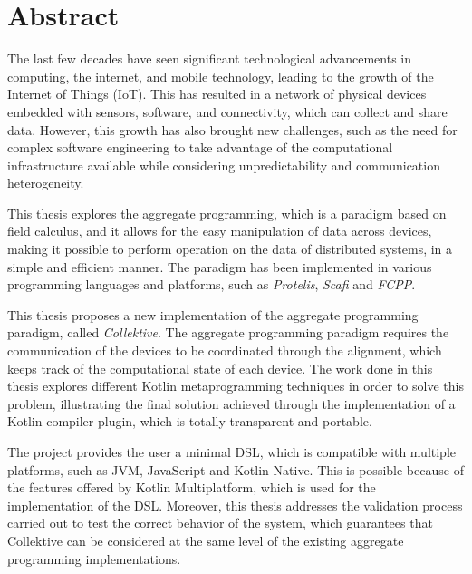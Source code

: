 \chapter*{Abstract}

The last few decades have seen significant technological advancements in computing, the internet, and mobile technology, leading to the growth of the Internet of Things (IoT). This has resulted in a network of physical devices embedded with sensors, software, and connectivity, which can collect and share data. However, this growth has also brought new challenges, such as the need for complex software engineering to take advantage of the computational infrastructure available while considering unpredictability and communication heterogeneity.

This thesis explores the aggregate programming, which is a paradigm based on field calculus, and it allows for the easy manipulation of data across devices, making it possible to perform operation on the data of distributed systems, in a simple and efficient manner. The paradigm has been implemented in various programming languages and platforms, such as \textit{Protelis}, \textit{Scafi} and \textit{FCPP}.

This thesis proposes a new implementation of the aggregate programming paradigm, called \textit{Collektive}.\newline
The aggregate programming paradigm requires the communication of the devices to be coordinated through the alignment, which keeps track of the computational state of each device. The work done in this thesis explores different Kotlin metaprogramming techniques in order to solve this problem, illustrating the final solution achieved through the implementation of a Kotlin compiler plugin, which is totally transparent and portable.

The project provides the user a minimal DSL, which is compatible with multiple platforms, such as JVM, JavaScript and Kotlin Native. This is possible because of the features offered by Kotlin Multiplatform, which is used for the implementation of the DSL. Moreover, this thesis addresses the validation process carried out to test the correct behavior of the system, which guarantees that Collektive can be considered at the same level of the existing aggregate programming implementations.
